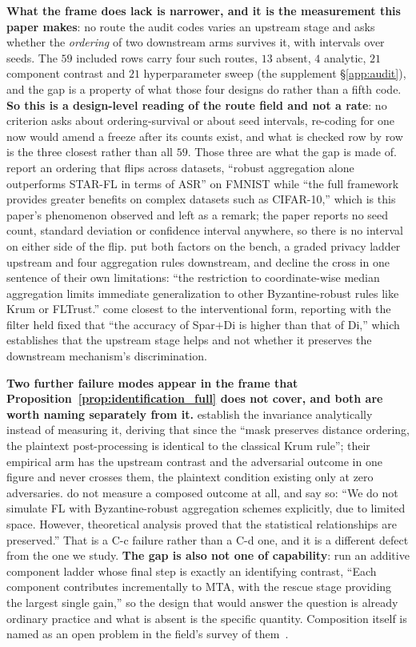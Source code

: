 \documentclass{article}
\begin{document}
\noindent \textbf{What the frame does lack is narrower, and it is the measurement this paper makes}: no route the audit codes varies an upstream stage and asks whether the \emph{ordering} of two downstream arms survives it, with intervals over seeds. The $59$ included rows carry four such routes, $13$ absent, $4$ analytic, $21$ component contrast and $21$ hyperparameter sweep (the supplement §\ref{app:audit}), and the gap is a property of what those four designs do rather than a fifth code. \textbf{So this is a design-level reading of the route field and not a rate}: no criterion asks about ordering-survival or about seed intervals, re-coding for one now would amend a freeze after its counts exist, and what is checked row by row is the three closest rather than all $59$. Those three are what the gap is made of. \citet{tabassum2026starfl} report an ordering that flips across datasets, ``robust aggregation alone outperforms STAR-FL in terms of ASR'' on FMNIST while ``the full framework provides greater benefits on complex datasets such as CIFAR-10,'' which is this paper's phenomenon observed and left as a remark; the paper reports no seed count, standard deviation or confidence interval anywhere, so there is no interval on either side of the flip. \citet{tory2026geoindist} put both factors on the bench, a graded privacy ladder upstream and four aggregation rules downstream, and decline the cross in one sentence of their own limitations: ``the restriction to coordinate-wise median aggregation limits immediate generalization to other Byzantine-robust rules like Krum or FLTrust.'' \citet{xu2024lasa} come closest to the interventional form, reporting with the filter held fixed that ``the accuracy of Spar$+$Di is higher than that of Di,'' which establishes that the upstream stage helps and not whether it preserves the downstream mechanism's discrimination.

\noindent \textbf{Two further failure modes appear in the frame that Proposition~\ref{prop:identification_full} does not cover, and both are worth naming separately from it.} \citet{kasyap2026provefl} establish the invariance analytically instead of measuring it, deriving that since the ``mask preserves distance ordering, the plaintext post-processing is identical to the classical Krum rule''; their empirical arm has the upstream contrast and the adversarial outcome in one figure and never crosses them, the plaintext condition existing only at zero adversaries. \citet{nath2026cqsa} do not measure a composed outcome at all, and say so: ``We do not simulate FL with Byzantine-robust aggregation schemes explicitly, due to limited space. However, theoretical analysis proved that the statistical relationships are preserved.'' That is a C-c failure rather than a C-d one, and it is a different defect from the one we study. \textbf{The gap is also not one of capability}: \citet{abacha2026fedsurrogate} run an additive component ladder whose final step is exactly an identifying contrast, ``Each component contributes incrementally to MTA, with the rescue stage providing the largest single gain,'' so the design that would answer the question is already ordinary practice and what is absent is the specific quantity. Composition itself is named as an open problem in the field's survey of them~\citep{kairouz2021advances}.
\end{document}
